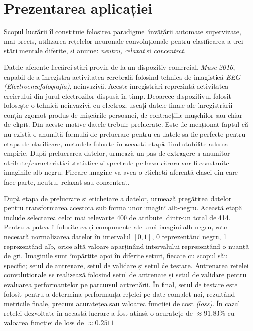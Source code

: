 \chapter{Prezentarea aplicației}\label{ch:3implementare}
Scopul lucrării îl constituie folosirea paradigmei învățării automate supervizate, mai precis, utilizarea rețelelor neuronale convoluționale pentru clasificarea a trei stări mentale diferite, și anume: \textit{neutru, relaxat} și \textit{concentrat}. 

Datele aferente fiecărei stări provin de la un dispozitiv comercial, \textit{Muse 2016}, capabil de a înregistra activitatea cerebrală folosind tehnica de imagistică \textit{EEG (Electroencefalografia)}, neinvazivă. Aceste înregistrări reprezintă activitatea creierului din jurul electrozilor dispusă în timp. Deoarece dispozitivul folosit folosește o tehnică neinvazivă cu electrozi uscați datele finale ale înregistrării conțin zgomot produs de mișcările persoanei, de contracțiile mușchilor sau chiar de clipit. Din aceste motive datele trebuie prelucrate. Este de menționat faptul că nu există o anumită formulă de prelucrare pentru ca datele sa fie perfecte pentru etapa de clasificare, metodele folosite în această etapă fiind stabilite adesea empiric. După prelucrarea datelor, urmează un pas de extragere a anumitor atribute/caracteristici statistice și spectrale pe baza cărora vor fi construite imaginile alb-negru. Fiecare imagine va avea o etichetă aferentă clasei din care face parte, neutru, relaxat sau concentrat.

După etapa de prelucrare și etichetare a datelor, urmează pregătirea datelor pentru transformarea acestora sub forma unor imagini alb-negru. Această etapă include selectarea celor mai relevante 400 de atribute, dintr-un total de 414. Pentru a putea fi folosite ca și componente ale unei imagini alb-negru, este necesară normalizarea datelor în intervalul $[0,1]$, 0 reprezentând negru, 1 reprezentând alb, orice altă valoare aparținând intervalului reprezentând o nuanță de gri. Imaginile sunt împărțite apoi în diferite seturi, fiecare cu scopul său specific; setul de antrenare, setul de validare și setul de testare. Antrenarea rețelei convoluționale se realizează folosind setul de antrenare și setul de validare pentru evaluarea performanțelor pe parcursul antrenării. În final, setul de testare este folosit pentru a determina performanța rețelei pe date complet noi, rezultând metricile finale, precum acuratețea sau valoarea funcției de cost \textit{(loss)}. În cazul rețelei dezvoltate în această lucrare a fost atinsă o acuratețe de $\approx91.83\%$ cu valoarea funcției de loss de $\approx0.2511$

